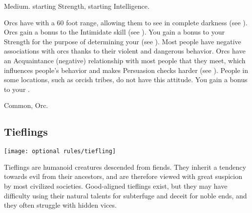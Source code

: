          Medium.
          starting Strength,  starting Intelligence.
        \begin{itemize}
             Orcs have  with a 60 foot range, allowing them to see in complete darkness (see ).
             Orcs gain a  bonus to the Intimidate skill (see ).
             You gain a  bonus to your Strength for the purpose of determining your  (see ).
             Most people have negative associations with orcs thanks to their violent and dangerous behavior.
                Orcs have an Acquaintance (negative) relationship with most people that they meet, which influences people's behavior and makes Persuasion checks harder (see ).
                People in some locations, such as orcish tribes, do not have this attitude.
             You gain a  bonus to your .
        \end{itemize}
         Common, Orc.

    \subsection{Tieflings}
        \texttt{[image: optional rules/tiefling]}

        Tieflings are humanoid creatures descended from fiends.
        They inherit a tendency towards evil from their ancestors, and are therefore viewed with great suspicion by most civilized societies.
        Good-aligned tieflings exist, but they may have difficulty using their natural talents for subterfuge and deceit for noble ends, and they often struggle with hidden vices.

